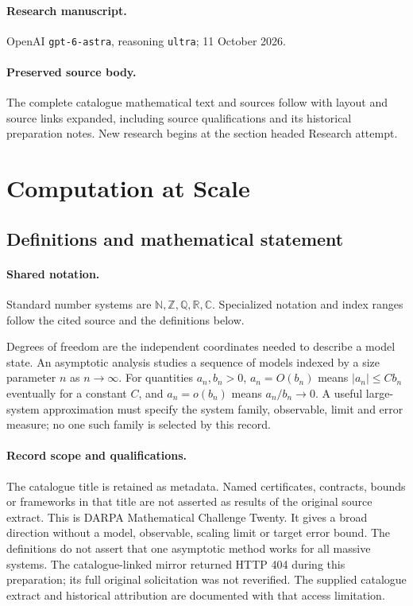 \documentclass[11pt]{article}
\begin{document}
\paragraph{Research manuscript.} OpenAI \texttt{gpt-6-astra}, reasoning \texttt{ultra}; 11 October 2026.
\paragraph{Preserved source body.} The complete catalogue mathematical text and sources follow with layout and source links expanded, including source qualifications and its historical preparation notes. New research begins at the section headed Research attempt.

\section{Computation at Scale}\label{statement}

\subsection{Definitions and mathematical statement}

\paragraph{Shared notation.}Standard number systems are $\mathbb N,\mathbb Z,\mathbb Q,\mathbb R,\mathbb C$. Specialized notation and index ranges follow the cited source and the definitions below.


Degrees of freedom are the independent coordinates needed to describe a model state. An asymptotic analysis studies a sequence of models indexed by a size parameter $n$ as $n\to\infty$. For quantities $a_n,b_n>0$, $a_n=O(b_n)$ means $|a_n|\leq Cb_n$ eventually for a constant $C$, and $a_n=o(b_n)$ means $a_n/b_n\to0$. A useful large-system approximation must specify the system family, observable, limit and error measure; no one such family is selected by this record.
\paragraph{Record scope and qualifications.}
The catalogue title is retained as metadata. Named certificates, contracts, bounds or frameworks in that title are not asserted as results of the original source extract.
This is DARPA Mathematical Challenge Twenty. It gives a broad direction without a model, observable, scaling limit or target error bound. The definitions do not assert that one asymptotic method works for all massive systems. The catalogue-linked mirror returned HTTP 404 during this preparation; its full original solicitation was not reverified. The supplied catalogue extract and historical attribution are documented with that access limitation.
\end{document}
